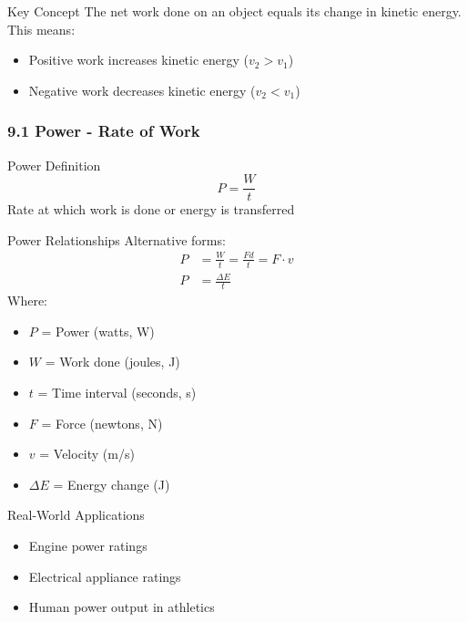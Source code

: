 \documentclass{beamer}
\begin{document}
\begin{frame}
\begin{alertblock}{Key Concept}
The net work done on an object equals its change in kinetic energy. This means:
\begin{itemize}
\item Positive work increases kinetic energy ($v_2 > v_1$)
\item Negative work decreases kinetic energy ($v_2 < v_1$)
\end{itemize}
\end{alertblock}
\end{frame}

\begin{frame}
\frametitle{9.1 Power - Rate of Work}
\begin{block}{Power Definition}
$$P = \frac{W}{t}$$
Rate at which work is done or energy is transferred
\end{block}
\end{frame}

\begin{frame}
\begin{block}{Power Relationships}
Alternative forms:
\begin{align*}
P &= \frac{W}{t} = \frac{Fd}{t} = F\cdot v \\[1em]
P &= \frac{\Delta E}{t}
\end{align*}
Where:
\begin{itemize}
\item $P$ = Power (watts, W)
\item $W$ = Work done (joules, J)
\item $t$ = Time interval (seconds, s)
\item $F$ = Force (newtons, N)
\item $v$ = Velocity (m/s)
\item $\Delta E$ = Energy change (J)
\end{itemize}
\end{block}

\begin{exampleblock}{Real-World Applications}
\begin{itemize}
\item Engine power ratings
\item Electrical appliance ratings
\item Human power output in athletics
\end{itemize}
\end{exampleblock}
\end{frame}
\end{document}
